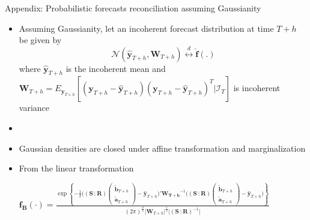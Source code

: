 \documentclass[11pt,xcolor=dvipsnames,table]{beamer} %
\def\bth{\begin{pmatrix}\tilde{\bm{b}}_{T+h}\\[-0.2cm]\tilde{\bm{a}}_{T+h}\end{pmatrix}}
\begin{document}

\begin{frame}[noframenumbering]{Appendix: Probabilistic forecasts reconciliation assuming Gaussianity}\hypertarget{GaussianFramework}{\hyperlink{backtoGaussianFramework}{}}
\begin{itemize}[<+-| alert@+>]
	\item Assuming Gaussianity, let an incoherent forecast distribution at time $T+h$ be given by
	$$\mathscr{N}(\hat{\bm{y}}_{T+h}, \bm{W}_{T+h}) \overset{d}{\leftrightarrow} \hat{\bm{f}}(.)$$ 
	where $\hat{\bm{y}}_{T+h}$ is the incoherent mean and ${\bm{W}}_{T+h} =E_{\bm{y}_{T+h}}[(\bm{y}_{T+h}-\hat{\bm{y}}_{T+h})(\bm{y}_{T+h}-\hat{\bm{y}}_{T+h})^T|\mathcal{I}_{T}]$ is incoherent variance 
	\item[]
	\item Gaussian densities are closed under affine transformation and marginalization
	\item From the linear transformation
	\begin{table}
		\centering \small
		
		$
		\bm{f_B}(\cdot)
		= \frac{\exp\left\{-\frac{1}{2}\Big((\bm{S} ~ \vdots~ \bm{R})\bth-\bm{\hat{y}}_{T+h}\Big)' \bm{W_{T+h}}^{-1}\Big((\bm{S} ~ \vdots~ \bm{R})\bth-\bm{\hat{y}}_{T+h}\Big)\right\}}{(2\pi)^{\frac{n}{2}}\Big|\bm{W}_{T+h}\Big|^{\frac{1}{2}}\Big|(\bm{S} ~ \vdots~ \bm{R})^{-1}\Big|}
		$\\
		
		
	\end{table}
	
	
	
\end{itemize}    

\end{frame}

\end{document}
